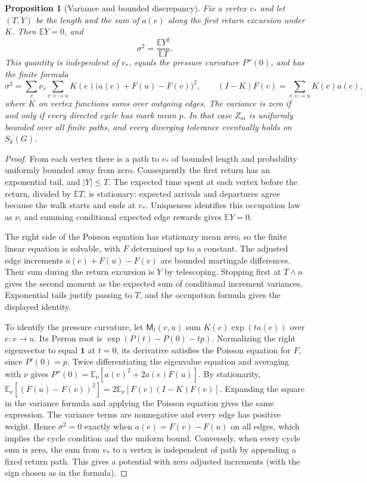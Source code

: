 \documentclass[11pt]{article}
\newtheorem{proposition}[theorem]{Proposition}
\theoremstyle{definition}
\theoremstyle{remark}
\begin{document}
\begin{proposition}[Variance and bounded discrepancy]
\label{prop:markov-discrepancy-variance}
Fix a vertex $v_*$ and let $(T,Y)$ be the length and the sum of
$a(e)$ along the first return excursion under $K$.
Then $\mathbb EY=0$, and
\[
 \sigma^2=\frac{\mathbb EY^2}{\mathbb ET}.
\]
This quantity is independent of $v_*$, equals the pressure curvature
$P''(0)$, and has the finite formula
\[
 \sigma^2=\sum_v\nu_v\sum_{e:v\to u}
                 K(e)\bigl(a(e)+F(u)-F(v)\bigr)^2,
 \qquad (I-K)F(v)=\sum_{e:v\to u}K(e)a(e),
\]
where $K$ on vertex functions sums over outgoing edges.
The variance is zero if and only if every directed cycle has mark
mean $p$. In that case $Z_m$ is uniformly bounded over all finite
paths, and every diverging tolerance eventually holds on
$S_k(G)$.
\end{proposition}
\begin{proof}
From each vertex there is a path to $v_*$ of bounded length
and probability uniformly bounded away from zero. Consequently
the first return has an exponential tail, and $|Y|\le T$.
The expected time spent at each vertex before the return,
divided by $\mathbb ET$, is stationary: expected arrivals and
departures agree because the walk starts and ends at $v_*$.
Uniqueness identifies this occupation law as $\nu$, and summing
conditional expected edge rewards gives $\mathbb EY=0$.

The right side of the Poisson equation has stationary mean zero,
so the finite linear equation is solvable, with $F$ determined
up to a constant. The adjusted edge increments
$a(e)+F(u)-F(v)$ are bounded martingale differences.
Their sum during the return excursion is $Y$ by telescoping.
Stopping first at $T\wedge n$ gives the second moment as the
expected sum of conditional increment variances. Exponential
tails justify passing to $T$, and the occupation formula gives
the displayed identity.

To identify the pressure curvature, let $\mathsf M_t(v,u)$
sum $K(e)\exp(t a(e))$ over $e:v\to u$.
Its Perron root is $\exp(P(t)-P(0)-tp)$.
Normalizing the right eigenvector to equal $\mathbf 1$ at
$t=0$, its derivative satisfies the Poisson equation for $F$,
since $P'(0)=p$. Twice differentiating the eigenvalue
equation and averaging with $\nu$ gives
$P''(0)=\mathbb E_\nu[a(e)^2+2a(e)F(u)]$.
By stationarity,
$\mathbb E_\nu[(F(u)-F(v))^2]=2\mathbb E_\nu[F(v)(I-K)F(v)]$.
Expanding the square in the variance formula and applying the
Poisson equation gives the same expression.
The variance terms are nonnegative and every edge has positive
weight. Hence $\sigma^2=0$ exactly when
$a(e)=F(v)-F(u)$ on all edges, which implies the cycle condition
and the uniform bound. Conversely, when every cycle sum is zero,
the sum from $v_*$ to a vertex is independent of path by appending
a fixed return path. This gives a potential with zero adjusted
increments (with the sign chosen as in the formula).
\end{proof}
\end{document}
